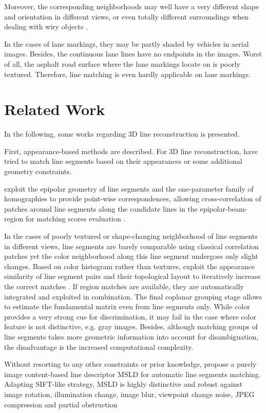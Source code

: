 Moreover, the corresponding neighborhoods may well have a very different shape and orientation in different views, or even totally different surroundings when dealing with wiry objects \cite{HoferFeb2013}.

In the cases of lane markings, they may be partly shaded by vehicles in aerial images. Besides, the continuous lane lines have no endpoints in the images. Worst of all, the asphalt road surface where the lane markings locate on is poorly textured. Therefore, line matching is even hardly applicable on lane markings.

\section{Related Work}
In the following, some works regarding 3D line reconstruction is presented.

First, appearance-based methods are described. For 3D line reconstruction, \cite{SchmidJun1997,BayJun2005,WangMay2009} have tried to match line segments based on their appearances or some additional geometry constraints.

\citeauthor{SchmidJun1997} exploit the epipolar geometry of line segments and the one-parameter family of homographies to provide point-wise correspondences, allowing cross-correlation of patches around line segments along the candidate lines in the epipolar-beam-region for matching scores evaluation \cite{SchmidJun1997}.

In the cases of poorly textured or shape-changing neighborhood of line segments in different views, line segments are barely comparable using classical correlation patches yet the color neighborhood along this line segment undergoes only slight changes. Based on color histogram rather than textures, \citeauthor{BayJun2005} exploit the appearance similarity of line segment pairs and their topological layout to iteratively increase the correct matches \cite{BayJun2005}. If region matches are available, they are automatically integrated and exploited in combination. The final coplanar grouping stage allows to estimate the fundamental matrix even from line segments only. While color provides a very strong cue for discrimination, it may fail in the case where color feature is not distinctive, e.g. gray images. Besides, although matching groups of line segments takes more geometric information into account for disambiguation, the disadvantage is the increased computational complexity.

Without resorting to any other constraints or prior knowledge, \citeauthor{WangMay2009} propose a purely image content-based line descriptor MSLD for automatic line segments matching. Adapting SIFT-like strategy, MSLD is highly distinctive and robust against image rotation, illumination change, image blur, viewpoint change noise, JPEG compression and partial obstruction \cite{WangMay2009}

